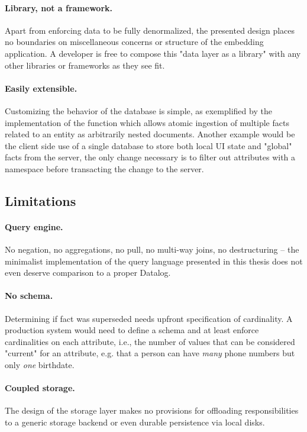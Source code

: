 \paragraph{Library, not a framework.} Apart from enforcing data to be fully denormalized, the presented design places no boundaries on miscellaneous concerns or structure of the embedding application. A developer is free to compose this "data layer as a library" with any other libraries or frameworks as they see fit.

\paragraph{Easily extensible.} Customizing the behavior of the database is simple, as exemplified by the implementation of the  function which allows atomic ingestion of multiple facts related to an entity as arbitrarily nested documents. Another example would be the client side use of a single database to store both local \gls{UI} state and "global" facts from the server, the only change necessary is to filter out attributes with a  namespace before transacting the change to the server.



\subsection{Limitations}

\paragraph{Query engine.} No negation, no aggregations, no pull, no multi-way joins, no destructuring -- the minimalist implementation of the query language presented in this thesis does not even deserve comparison to a proper Datalog.

\paragraph{No schema.} Determining if fact was superseded needs upfront specification of cardinality. A production system would need to define a schema and at least enforce cardinalities on each attribute, i.e., the number of values that can be considered "current" for an attribute, e.g. that a person can have \emph{many} phone numbers but only \emph{one} birthdate.

\paragraph{Coupled storage.} The design of the storage layer makes no provisions for offloading responsibilities to a generic storage backend or even durable persistence via local disks.

